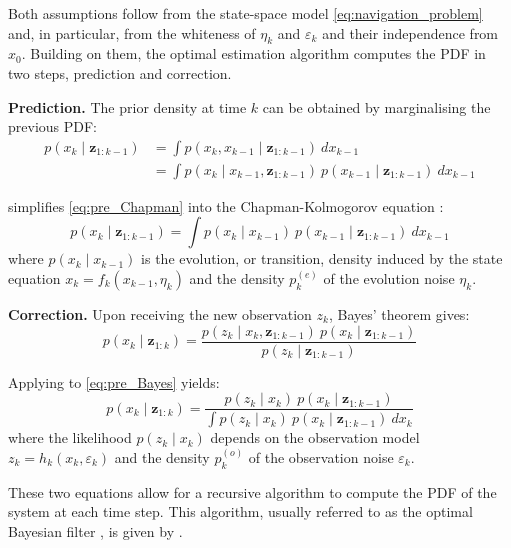 Both assumptions follow from the state-space model \eqref{eq:navigation_problem} and, in particular, from the whiteness of $\eta_k$ and $\varepsilon_k$ and their independence from $x_0$. Building on them, the optimal estimation algorithm computes the PDF in two steps, prediction and correction.

\textbf{Prediction.} The prior density at time $k$ can be obtained by marginalising the previous PDF:
\begin{equation}
	\begin{aligned}
	p(x_k\mid\mathbf{z}_{1:k-1})&=\int{p(x_k,x_{k-1}\mid\mathbf{z}_{1:k-1})\:dx_{k-1}}\\
	&=\int{p(x_k\mid x_{k-1},\mathbf{z}_{1:k-1})\:p(x_{k-1}\mid\mathbf{z}_{1:k-1})\:dx_{k-1}}
	\end{aligned}\label{eq:pre_Chapman}
\end{equation}

 simplifies \eqref{eq:pre_Chapman} into the Chapman-Kolmogorov equation \cite{bib:filtering-equations}:
\begin{equation}
	p(x_k\mid\mathbf{z}_{1:k-1})=\int{p(x_k\mid x_{k-1})\:p(x_{k-1}\mid\mathbf{z}_{1:k-1})\:dx_{k-1}}\label{eq:Chapman_Kolmogorov}
\end{equation}
where $p(x_k\mid x_{k-1})$ is the evolution, or transition, density induced by the state equation $x_k=f_k(x_{k-1},\eta_k)$ and the density $p_k^{(e)}$ of the evolution noise $\eta_k$.

\textbf{Correction.} Upon receiving the new observation $z_k$, Bayes' theorem gives:
\begin{equation}
	p(x_k\mid\mathbf{z}_{1:k})=\frac{p(z_k\mid x_k,\mathbf{z}_{1:k-1})\:p(x_k\mid\mathbf{z}_{1:k-1})}{p(z_k\mid\mathbf{z}_{1:k-1})}\label{eq:pre_Bayes}
\end{equation}

Applying  to \eqref{eq:pre_Bayes} yields:
\begin{equation}
	p(x_k\mid\mathbf{z}_{1:k})=\frac{p(z_k\mid x_k)\:p(x_k\mid\mathbf{z}_{1:k-1})}{\displaystyle\int{p(z_k\mid x_k)\:p(x_k\mid\mathbf{z}_{1:k-1})\:dx_k}}\label{eq:Bayes_theorem}
\end{equation}
where the likelihood $p(z_k\mid x_k)$ depends on the observation model $z_k=h_k(x_k,\varepsilon_k)$ and the density $p_k^{(o)}$ of the observation noise $\varepsilon_k$.

These two equations allow for a recursive algorithm to compute the PDF of the system at each time step. This algorithm, usually referred to as the optimal Bayesian filter \cite{bib:tuto-PF}, is given by .

